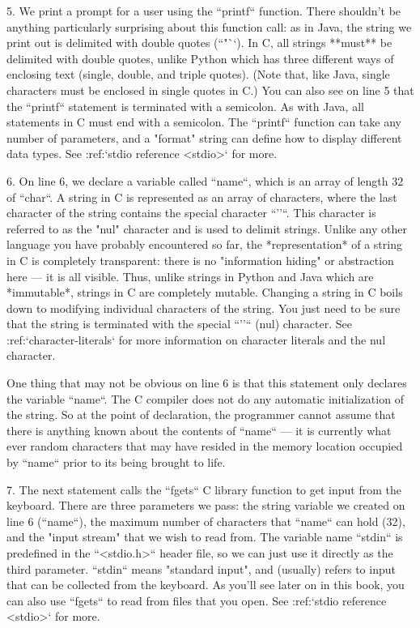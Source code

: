   5.  We print a prompt for a user using the ``printf`` function.  There shouldn't be anything particularly surprising about this function call: as in Java, the string we print out is delimited with double quotes (``"``).  In C, all strings **must** be delimited with double quotes, unlike Python which has three different ways of enclosing text (single, double, and triple quotes).  (Note that, like Java, single characters must be enclosed in single quotes in C.)  You can also see on line 5 that the ``printf`` statement is terminated with a semicolon.  As with Java, all statements in C must end with a semicolon.   The ``printf`` function can take any number of parameters, and a "format" string can define how to display different data types.  See :ref:`stdio reference <stdio>` for more.

  6.  On line 6, we declare a variable called ``name``, which is an array of length 32 of ``char``.  A string in C is represented as an array of characters, where the last character of the string contains the special character ``'\0'``.  This character is referred to as the "nul" character and is used to delimit strings.  Unlike any other language you have probably encountered so far, the *representation* of a string in C is completely transparent: there is no "information hiding" or abstraction here --- it is all visible.  Thus, unlike strings in Python and Java which are *immutable*, strings in C are completely mutable.  Changing a string in C boils down to modifying individual characters of the string.  You just need to be sure that the string is terminated with the special ``'\0'`` (nul) character.  See :ref:`character-literals` for more information on character literals and the nul character.

      One thing that may not be obvious on line 6 is that this statement only declares the variable ``name``.  The C compiler does not do any automatic initialization of the string.  So at the point of declaration, the programmer cannot assume that there is anything known about the contents of ``name`` --- it is currently what ever random characters that may have resided in the memory location occupied by ``name`` prior to its being brought to life.

  7.  The next statement calls the ``fgets`` C library function to get input from the keyboard.  There are three parameters we pass: the string variable we created on line 6 (``name``), the maximum number of characters that ``name`` can hold (32), and the "input stream" that we wish to read from.  The variable name ``stdin`` is predefined in the ``<stdio.h>`` header file, so we can just use it directly as the third parameter.  ``stdin`` means "standard input", and (usually) refers to input that can be collected from the keyboard.  As you'll see later on in this book, you can also use ``fgets`` to read from files that you open.  See :ref:`stdio reference <stdio>` for more.

